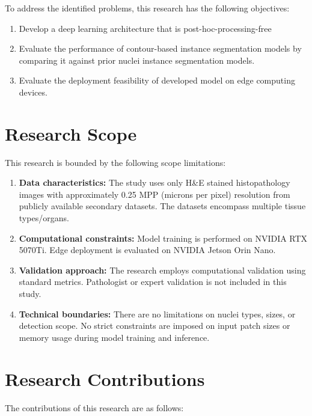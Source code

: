 To address the identified problems, this research has the following objectives:

\begin{enumerate}
	\item Develop a deep learning architecture that is post-hoc-processing-free
	\item Evaluate the performance of contour-based instance segmentation models by comparing it against prior nuclei instance segmentation models.
	\item Evaluate the deployment feasibility of developed model on edge computing devices.
\end{enumerate}

\section{Research Scope}

This research is bounded by the following scope limitations:

\begin{enumerate}
	\item \textbf{Data characteristics:} The study uses only H\&E stained histopathology images with approximately 0.25 MPP (microns per pixel) resolution from publicly available secondary datasets. The datasets encompass multiple tissue types/organs.
	
	\item \textbf{Computational constraints:} Model training is performed on NVIDIA RTX 5070Ti. Edge deployment is evaluated on NVIDIA Jetson Orin Nano. 
	
	\item \textbf{Validation approach:} The research employs computational validation using standard metrics. Pathologist or expert validation is not included in this study.
	
	\item \textbf{Technical boundaries:} There are no limitations on nuclei types, sizes, or detection scope. No strict constraints are imposed on input patch sizes or memory usage during model training and inference.
\end{enumerate}

\section{Research Contributions}

The contributions of this research are as follows:

